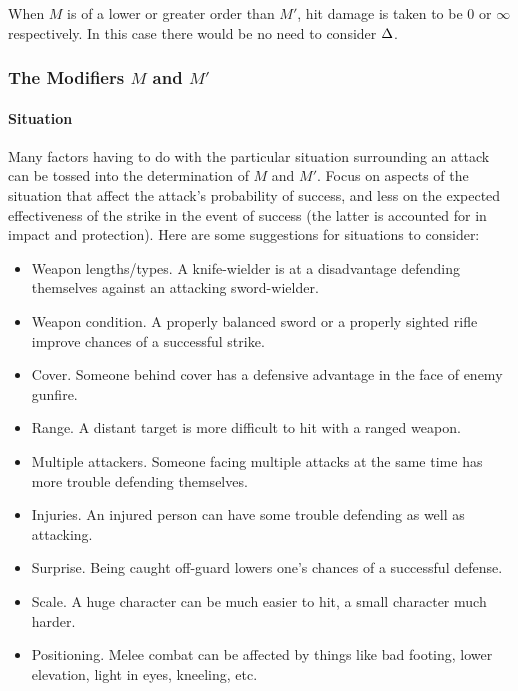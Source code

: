\documentclass[12pt]{article}
\begin{document}
When $M$ is of a lower or greater order than $M'$, hit damage is taken to be $0$ or $\infty$ respectively.
In this case there would be no need to consider $\Delta$.


\subsubsection{The Modifiers $M$ and $M'$}\label{sec:sitmod}


\paragraph{Situation}
Many factors having to do with the particular situation
surrounding an attack can be tossed into the determination of $M$ and $M'$.
Focus on
aspects of the situation that affect the attack's probability of success,
and less on the expected effectiveness of the strike in the
event of success (the latter is accounted for in impact and protection).
Here are some suggestions for situations to consider:
\vspace{-1em}\begin{itemize}
\item Weapon lengths/types. A knife-wielder is at a disadvantage defending themselves against an attacking sword-wielder.
\item Weapon condition. A properly balanced sword or a properly sighted rifle improve chances of a successful strike.
\item Cover. Someone behind cover has a defensive advantage in the face of enemy gunfire.
\item Range. A distant target is more difficult to hit with a ranged weapon.
\item Multiple attackers. Someone facing multiple attacks at the same time has more trouble defending themselves.
\item Injuries. An injured person can have some trouble defending as well as attacking.
\item Surprise. Being caught off-guard lowers one's chances of a successful defense.
\item Scale. A huge character can be much easier to hit, a small character much harder.
\item Positioning. Melee combat can be affected by things like bad footing,
lower elevation, light in eyes, kneeling, etc. %
\end{itemize}
\end{document}
